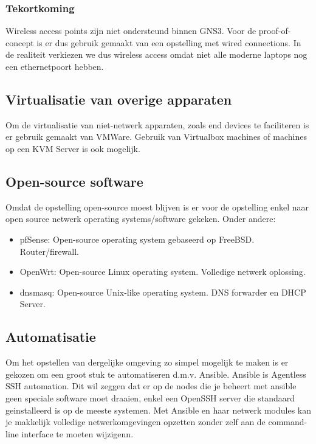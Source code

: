 \subsubsection{Tekortkoming}
Wireless access points zijn niet ondersteund binnen GNS3. Voor de proof-of-concept is er dus gebruik gemaakt van een opstelling met wired connections. In de realiteit verkiezen we dus wireless access omdat niet alle moderne laptops nog een ethernetpoort hebben.   

\subsection{Virtualisatie van overige apparaten}
Om de virtualisatie van niet-netwerk apparaten, zoals end devices te faciliteren is er gebruik gemaakt van VMWare. Gebruik van Virtualbox machines of machines op een KVM Server is ook mogelijk. 


\subsection{Open-source software}
Omdat de opstelling open-source moest blijven is er voor de opstelling enkel naar open source netwerk operating systems/software gekeken. Onder andere:
\begin{itemize}	
	\item pfSense: Open-source operating system gebaseerd op FreeBSD. Router/firewall.
	\item OpenWrt: Open-source Linux operating system. Volledige netwerk oplossing. 
	\item dnsmasq: Open-source Unix-like operating system. DNS forwarder en DHCP Server.
\end{itemize}


\subsection{Automatisatie}

Om het opstellen van dergelijke omgeving zo simpel mogelijk te maken is er gekozen om een groot stuk te automatiseren d.m.v. Ansible. Ansible is Agentless SSH automation. Dit wil zeggen dat er op de nodes die je beheert met ansible geen speciale software moet draaien, enkel een OpenSSH server die standaard geinstalleerd is op de meeste systemen. Met Ansible en haar netwerk modules kan je makkelijk volledige netwerkomgevingen opzetten zonder zelf aan de command-line interface te moeten wijzigenn. 

